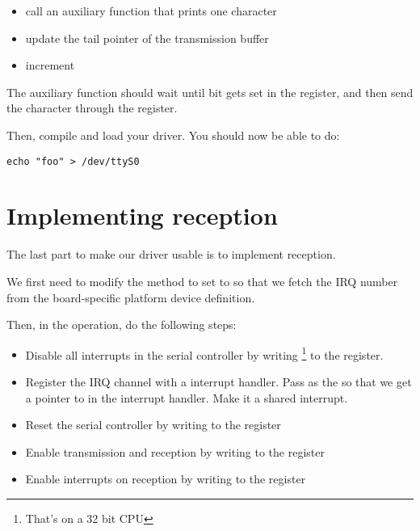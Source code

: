 \begin{itemize}
\item call an auxiliary function that prints one character
\item update the tail pointer of the transmission buffer
\item increment 
\end{itemize}

The auxiliary function should wait until bit 
gets set in the  register, and then send the
character through the  register.

Then, compile and load your driver. You should now be able to do:

\begin{verbatim}
echo "foo" > /dev/ttyS0
\end{verbatim}

\section{Implementing reception}

The last part to make our driver usable is to implement reception.

We first need to modify the  method to set
 to  so that we fetch
the IRQ number from the board-specific platform device definition.

Then, in the  operation, do the following steps:

\begin{itemize}

\item Disable all interrupts in the serial controller by writing
  \footnote{That's  on a 32 bit CPU}
  to the  register.

\item Register the  IRQ channel with a
   interrupt handler.
  Pass  as the  so that we
  get a pointer to  in the interrupt handler. Make it a shared
  interrupt.

\item Reset the serial controller by writing  to the  register

\item Enable transmission and reception by writing  to the  register

\item Enable interrupts on reception by writing  to
  the  register

\end{itemize}


